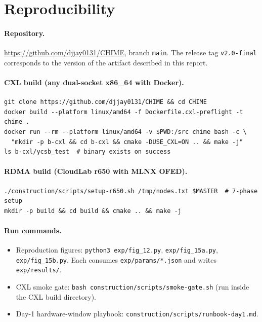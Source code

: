 \documentclass[11pt,a4paper]{article}
\begin{document}
\appendix

\section{Reproducibility}
\label{app:repro}

\paragraph{Repository.} \url{https://github.com/djjay0131/CHIME}, branch \texttt{main}. The release tag \texttt{v2.0-final} corresponds to the version of the artifact described in this report.

\paragraph{CXL build (any dual-socket x86\_64 with Docker).}
\begin{lstlisting}
git clone https://github.com/djjay0131/CHIME && cd CHIME
docker build --platform linux/amd64 -f Dockerfile.cxl-preflight -t chime .
docker run --rm --platform linux/amd64 -v $PWD:/src chime bash -c \
  "mkdir -p b-cxl && cd b-cxl && cmake -DUSE_CXL=ON .. && make -j"
ls b-cxl/ycsb_test  # binary exists on success
\end{lstlisting}

\paragraph{RDMA build (CloudLab r650 with MLNX OFED).}
\begin{lstlisting}
./construction/scripts/setup-r650.sh /tmp/nodes.txt $MASTER  # 7-phase setup
mkdir -p build && cd build && cmake .. && make -j
\end{lstlisting}

\paragraph{Run commands.}
\begin{itemize}[nosep]
    \item Reproduction figures: \texttt{python3 exp/fig\_12.py}, \texttt{exp/fig\_15a.py}, \texttt{exp/fig\_15b.py}. Each consumes \texttt{exp/params/*.json} and writes \texttt{exp/results/}.
    \item CXL smoke gate: \texttt{bash construction/scripts/smoke-gate.sh} (run inside the CXL build directory).
    \item Day-1 hardware-window playbook: \texttt{construction/scripts/runbook-day1.md}.
\end{itemize}
\end{document}
